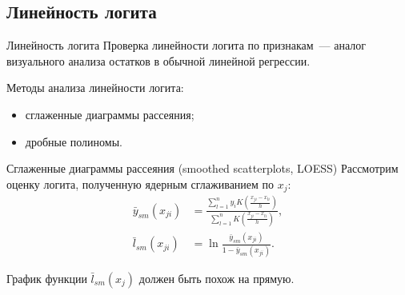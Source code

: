 \documentclass[9pt,pdf,utf8,hyperref={unicode},aspectratio=169]{beamer}
\renewcommand{\leq}{\leqslant}
\begin{document}
\subsection{Линейность логита}
\begin{frame}{Линейность логита}
    Проверка линейности логита по признакам~--- аналог визуального анализа остатков в обычной линейной регрессии.

    \bigskip

    Методы анализа линейности логита:
    \begin{itemize}
    \item сглаженные диаграммы рассеяния;
    \item дробные полиномы.
    \end{itemize}
\end{frame}

\begin{frame}{Сглаженные диаграммы рассеяния (smoothed scatterplots, LOESS)}
    Рассмотрим оценку логита, полученную ядерным сглаживанием по $x_j$:
     \begin{align*}
     \bar{y}_{sm}\left(x_{ji}\right) &= \frac{\sum\limits_{l=1}^n y_i K\left(\frac{x_{ji}-x_{li}}{h}\right)}{\sum\limits_{l=1}^n K\left(\frac{x_{ji}-x_{li}}{h}\right)}, \\
     \bar{l}_{sm}\left(x_{ji}\right) &= \ln \frac{\bar{y}_{sm}\left(x_{ji}\right)}{1-\bar{y}_{sm}\left(x_{ji}\right)}.
     \end{align*}

     \bigskip

     График функции $\bar{l}_{sm}\left(x_{j}\right) $ должен быть похож на прямую.
\end{frame}

\end{document}
